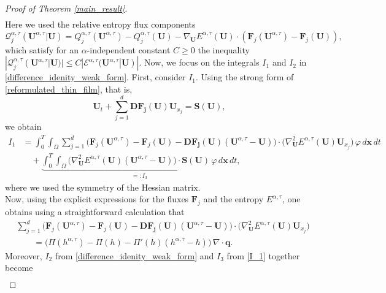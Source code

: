 \documentclass[11pt]{article}
\numberwithin{equation}{section}
\newtheorem{counter example}[theorem]{Counter Example}
\numberwithin{equation}{section}
\numberwithin{equation}{section}
\newcommand{\rel}{^{\alpha, \tau}}
\begin{document}
\begin{proof}[Proof of Theorem \ref{main_result}]
\begin{equation}
\begin{aligned}
\end{aligned}
\end{equation}
Here we used the relative entropy flux components
\[
\mathcal{Q}^{\alpha, \tau}_j(\mathbf{U}\rel| {\mathbf U})= Q^{\alpha, \tau}_j(\mathbf{U}\rel)-Q^{\alpha, \tau}_j(\mathbf{{U}})-\nabla_{\mathbf{U}}E^{\alpha, \tau}(\mathbf{{U}})\cdot (\mathbf{F}_j(\mathbf{U}\rel)-\mathbf{F}_j\mathbf{({U})}), \]
which satisfy for an $\alpha$-independent constant $C\ge0$ the inequality
$|\mathcal{Q}_j^{\alpha, \tau}(\mathbf{U}\rel| {\mathbf U})|\leq C |\mathcal{E}^{\alpha, \tau}(\mathbf{U}\rel| {\mathbf U})|.
$
Now, we focus on the integrals $I_1$ and $I_2$ in
\eqref{difference_idenity_weak_form}. First, consider $I_1$.
Using the strong form of \eqref{reformulated_thin_film}, that is,
\[
\mathbf U_t+\sum_{j=1}^{d}\mathbf {DF_j}(\mathbf U)\mathbf U_{x_j}
=
\mathbf S(\mathbf U),
\]
we obtain
\begin{equation}\label{I_1}
\begin{aligned}
I_1
&=
\int_0^T\int_\Omega
\sum_{j=1}^{d}
\Big(
\mathbf F_j(\mathbf U\rel)-\mathbf F_j(\mathbf U)-\mathbf {DF_j}(\mathbf U)(\mathbf U\rel-\mathbf U)
\Big)\cdot
\big(\nabla_{\mathbf U}^2E^{\alpha,\tau}(\mathbf U)\mathbf U_{x_j}\big)
\,\varphi\,d\mathbf x\,dt\\
&\quad
+\underbrace{\int_0^T\int_\Omega
\big(\nabla_{\mathbf U}^2E^{\alpha,\tau}(\mathbf U)(\mathbf U\rel-\mathbf U)\big)\cdot
\mathbf S(\mathbf U)
\,\varphi\,d\mathbf x\,dt}_{=:I_3},
\end{aligned}
\end{equation}
where we used the symmetry of the Hessian matrix.\\
Now, using the explicit expressions for the fluxes $\mathbf F_j$ and the entropy
$E^{\alpha,\tau}$, one obtains using a straightforward calculation that
\begin{equation}\label{taylor_remainder_F}
\begin{aligned}
&\sum_{j=1}^{d}
\Big(
\mathbf F_j(\mathbf U\rel)-\mathbf F_j(\mathbf U)-\mathbf {DF_j}(\mathbf U)(\mathbf U\rel-\mathbf U)
\Big)\cdot
\big(\nabla_{\mathbf U}^2E^{\alpha,\tau}(\mathbf U)\mathbf U_{x_j}\big)\\
&\qquad=
\big(\Pi(h\rel)-\Pi(h)-\Pi'(h)(h\rel-h)\big)\,\nabla\cdot \mathbf q.
\end{aligned}
\end{equation}
Moreover, $I_2$ from \eqref{difference_idenity_weak_form} and $I_3$ from \eqref{I_1} together become
\begin{equation}
    \begin{aligned}

\end{aligned}
\end{equation}
\end{proof}
\end{document}

